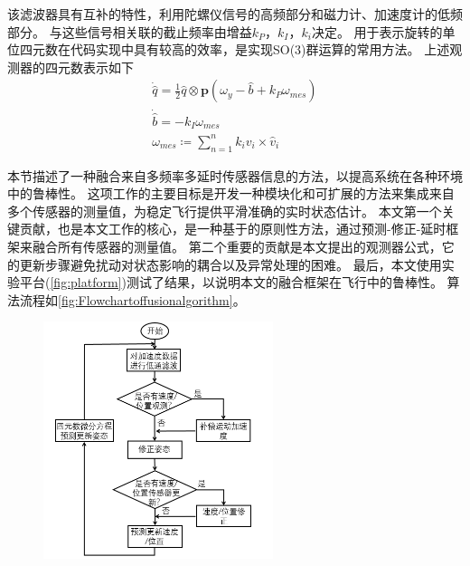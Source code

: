 \documentclass[
  type=master
]{gdutthesis}
\begin{document}
该滤波器具有互补的特性，利用陀螺仪信号的高频部分和磁力计、加速度计的低频部分\cite{mahony2008nonlinear}。
与这些信号相关联的截止频率由增益$k_P$，$k_I$，$k_i$决定。
用于表示旋转的单位四元数在代码实现中具有较高的效率，是实现SO(3)\vspace{1ex}群运算的常用方法。
上述观测器的四元数表示如下
\begin{gather}\label{eq:quatfilter}
		\dot{\hat{q}}=\frac{1}{2} \hat{q} \otimes \mathbf{p}(\omega_y - \hat{b} + k_P \omega_{mes})\\
		\dot{\hat{b}}=-k_I \omega_{mes}\\
		\omega_{mes} \coloneqq \sum_{n=1}^{n} k_i v_i \times \hat{v}_i	
\end{gather}

本节描述了一种融合来自多频率多延时传感器信息的方法，以提高系统在各种环境中的鲁棒性。
这项工作的主要目标是开发一种模块化和可扩展的方法来集成来自多个传感器的测量值，为稳定飞行提供平滑准确的实时状态估计。
本文第一个关键贡献，也是本文工作的核心，是一种基于\parencite{mahony2008nonlinear}的原则性方法，通过预测-修正-延时框架来融合所有传感器的测量值。
第二个重要的贡献是本文提出的观测器公式，它的更新步骤避免扰动对状态影响的耦合以及异常处理的困难。
最后，本文使用实验平台(\autoref{fig:platform})测试了结果，以说明本文的融合框架在飞行中的鲁棒性。
算法流程如\autoref{fig:Flowchartoffusionalgorithm}。
\begin{figure}[H]
	\centering
	\includegraphics[width=0.6\textwidth]{屏幕截图 2022-03-06 210135.png}
	\label{fig:Flowchartoffusionalgorithm}
\end{figure}
\end{document}
